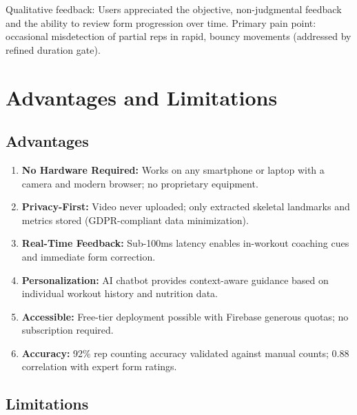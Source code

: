 \documentclass[12pt,a4paper]{article}
\begin{document}
Qualitative feedback: Users appreciated the objective, non-judgmental feedback 
and the ability to review form progression over time. Primary pain point: 
occasional misdetection of partial reps in rapid, bouncy movements (addressed 
by refined duration gate).

\section{Advantages and Limitations}

\subsection{Advantages}

\begin{enumerate}[noitemsep, topsep=2pt]
  \item \textbf{No Hardware Required:} Works on any smartphone or laptop with 
        a camera and modern browser; no proprietary equipment.
  
  \item \textbf{Privacy-First:} Video never uploaded; only extracted skeletal 
        landmarks and metrics stored (GDPR-compliant data minimization).
  
  \item \textbf{Real-Time Feedback:} Sub-100ms latency enables in-workout 
        coaching cues and immediate form correction.
  
  \item \textbf{Personalization:} AI chatbot provides context-aware guidance 
        based on individual workout history and nutrition data.
  
  \item \textbf{Accessible:} Free-tier deployment possible with Firebase 
        generous quotas; no subscription required.
  
  \item \textbf{Accuracy:} 92\% rep counting accuracy validated against manual 
        counts; 0.88 correlation with expert form ratings.
\end{enumerate}

\subsection{Limitations}
\end{document}
